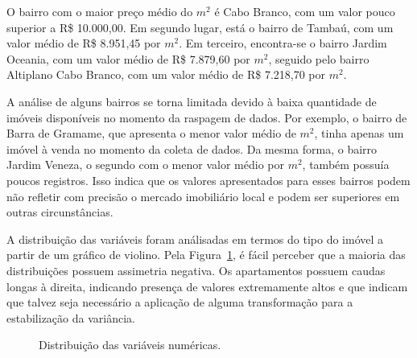 \documentclass[
  12pt,
  a4paper,
]{scrreprt}
\begin{document}
\vspace{12pt}

O bairro com o maior preço médio do \(m^2\) é Cabo Branco, com um valor
pouco superior a R\$ 10.000,00. Em segundo lugar, está o bairro de
Tambaú, com um valor médio de R\$ 8.951,45 por \(m^2\). Em terceiro,
encontra-se o bairro Jardim Oceania, com um valor médio de R\$ 7.879,60
por \(m^2\), seguido pelo bairro Altiplano Cabo Branco, com um valor
médio de R\$ 7.218,70 por \(m^2\).

\vspace{12pt}

A análise de alguns bairros se torna limitada devido à baixa quantidade
de imóveis disponíveis no momento da raspagem de dados. Por exemplo, o
bairro de Barra de Gramame, que apresenta o menor valor médio de
\(m^2\), tinha apenas um imóvel à venda no momento da coleta de dados.
Da mesma forma, o bairro Jardim Veneza, o segundo com o menor valor
médio por \(m^2\), também possuía poucos registros. Isso indica que os
valores apresentados para esses bairros podem não refletir com precisão
o mercado imobiliário local e podem ser superiores em outras
circunstâncias.

\vspace{12pt}

A distribuição das variáveis foram análisadas em termos do tipo do
imóvel a partir de um gráfico de violino. Pela Figura~\ref{fig-violin},
é fácil perceber que a maioria das distribuições possuem assimetria
negativa. Os apartamentos possuem caudas longas à direita, indicando
presença de valores extremamente altos e que indicam que talvez seja
necessário a aplicação de alguma transformação para a estabilização da
variância.

\begin{figure}


\caption{\label{fig-violin}Distribuição das variáveis numéricas.}

\end{figure}%
\end{document}
